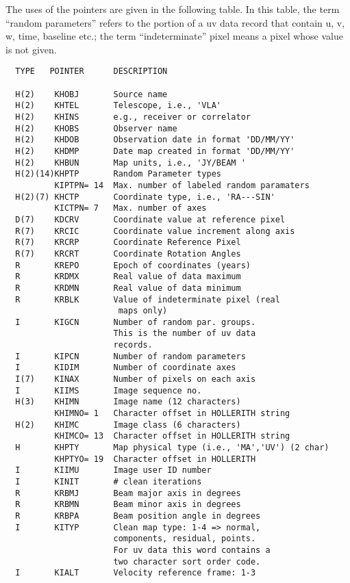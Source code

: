The uses of the pointers are given in the following table.  In this
table, the term ``random parameters'' refers to the portion of a uv
data record that contain u, v, w, time, baseline etc.; the term
``indeterminate'' pixel means a pixel whose value is not given.


\begin{verbatim}
  TYPE   POINTER      DESCRIPTION

  H(2)    KHOBJ       Source name
  H(2)    KHTEL       Telescope, i.e., 'VLA'
  H(2)    KHINS       e.g., receiver or correlator
  H(2)    KHOBS       Observer name
  H(2)    KHDOB       Observation date in format 'DD/MM/YY'
  H(2)    KHDMP       Date map created in format 'DD/MM/YY'
  H(2)    KHBUN       Map units, i.e., 'JY/BEAM '
  H(2)(14)KHPTP       Random Parameter types
          KIPTPN= 14  Max. number of labeled random paramaters
  H(2)(7) KHCTP       Coordinate type, i.e., 'RA---SIN'
          KICTPN= 7   Max. number of axes
  D(7)    KDCRV       Coordinate value at reference pixel
  R(7)    KRCIC       Coordinate value increment along axis
  R(7)    KRCRP       Coordinate Reference Pixel
  R(7)    KRCRT       Coordinate Rotation Angles
  R       KREPO       Epoch of coordinates (years)
  R       KRDMX       Real value of data maximum
  R       KRDMN       Real value of data minimum
  R       KRBLK       Value of indeterminate pixel (real
                       maps only)
  I       KIGCN       Number of random par. groups.
                      This is the number of uv data
                      records.
  I       KIPCN       Number of random parameters
  I       KIDIM       Number of coordinate axes
  I(7)    KINAX       Number of pixels on each axis
  I       KIIMS       Image sequence no.
  H(3)    KHIMN       Image name (12 characters)
          KHIMNO= 1   Character offset in HOLLERITH string
  H(2)    KHIMC       Image class (6 characters)
          KHIMCO= 13  Character offset in HOLLERITH string
  H       KHPTY       Map physical type (i.e., 'MA','UV') (2 char)
          KHPTYO= 19  Character offset in HOLLERITH
  I       KIIMU       Image user ID number
  I       KINIT       # clean iterations
  R       KRBMJ       Beam major axis in degrees
  R       KRBMN       Beam minor axis in degrees
  R       KRBPA       Beam position angle in degrees
  I       KITYP       Clean map type: 1-4 => normal,
                      components, residual, points.
                      For uv data this word contains a
                      two character sort order code.
  I       KIALT       Velocity reference frame: 1-3

\end{verbatim}
